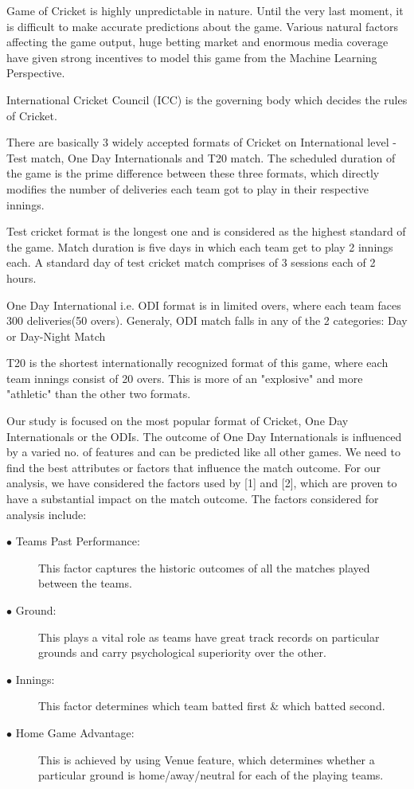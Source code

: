 \documentclass[a4paper, 10pt, conference]{IEEEtran}
\begin{document}
Game of Cricket is highly unpredictable in nature. Until the very last moment, it is difficult to make accurate predictions about the game. Various natural factors affecting the game output, huge betting market and enormous media coverage have given strong incentives to model this game from the Machine Learning Perspective.

International Cricket Council (ICC) is the governing body which decides the rules of Cricket.

There are basically 3 widely accepted formats of Cricket on International level - Test match, One Day Internationals and T20 match. The scheduled duration of the game is the prime difference between these three formats, which directly modifies the number of deliveries each team got to play in their respective innings.

Test cricket format is the longest one and is considered as the highest standard of the game. Match duration is five days in which each team get to play 2 innings each. A standard day of test cricket match comprises of 3 sessions each of 2 hours.

One Day International i.e. ODI format is in limited overs, where each team faces 300 deliveries(50 overs). Generaly, ODI match falls in any of the 2 categories: Day or Day-Night Match

T20 is the shortest internationally recognized format of this game, where each team innings consist of 20 overs. This is more of an "explosive" and more "athletic" than the other two formats.

Our study is focused on the most popular format of Cricket, One Day Internationals or the ODIs. The outcome of One Day Internationals is influenced by a varied no. of features and can be predicted like all other games. We need to find the best attributes or factors that influence the match outcome. For our analysis, we have considered the factors used by [1] and [2], which are proven to have a substantial impact on the match outcome. The factors considered for analysis include:

\begin{description}
  \item[$\bullet$ Teams Past Performance:] This factor captures the historic outcomes of all the matches played between the teams.
  \item[$\bullet$ Ground:] This plays a vital role as teams have great track records on particular grounds and carry psychological superiority over the other.
  \item[$\bullet$ Innings:] This factor determines which team batted first \& which batted second.
  \item[$\bullet$ Home Game Advantage:] This is achieved by using Venue feature, which determines whether a particular ground is home/away/neutral for each of the playing teams.
\end{description}
\end{document}
